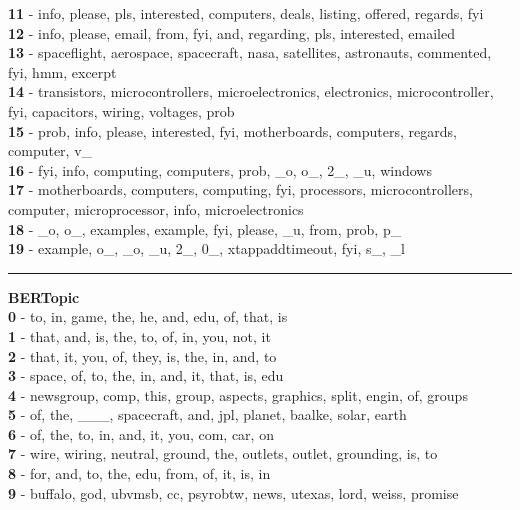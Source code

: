 \textbf{11} - info, please, pls, interested, computers, deals, listing, offered, regards, fyi\\
\textbf{12} - info, please, email, from, fyi, and, regarding, pls, interested, emailed\\
\textbf{13} - spaceflight, aerospace, spacecraft, nasa, satellites, astronauts, commented, fyi, hmm, excerpt\\
\textbf{14} - transistors, microcontrollers, microelectronics, electronics, microcontroller, fyi, capacitors, wiring, voltages, prob\\
\textbf{15} - prob, info, please, interested, fyi, motherboards, computers, regards, computer, v\_\\
\textbf{16} - fyi, info, computing, computers, prob, \_o, o\_, 2\_, \_u, windows\\
\textbf{17} - motherboards, computers, computing, fyi, processors, microcontrollers, computer, microprocessor, info, microelectronics\\
\textbf{18} - \_o, o\_, examples, example, fyi, please, \_u, from, prob, p\_\\
\textbf{19} - example, o\_, \_o, \_u, 2\_, 0\_, xtappaddtimeout, fyi, s\_, \_l\\
\hrule\vspace{2mm}
\noindent
\textbf{BERTopic}\vspace{2mm}\\
\vspace{2mm}
\noindent
\textbf{0} - to, in, game, the, he, and, edu, of, that, is\\
\textbf{1} - that, and, is, the, to, of, in, you, not, it\\
\textbf{2} - that, it, you, of, they, is, the, in, and, to\\
\textbf{3} - space, of, to, the, in, and, it, that, is, edu\\
\textbf{4} - newsgroup, comp, this, group, aspects, graphics, split, engin, of, groups\\
\textbf{5} - of, the, \_\_\_, spacecraft, and, jpl, planet, baalke, solar, earth\\
\textbf{6} - of, the, to, in, and, it, you, com, car, on\\
\textbf{7} - wire, wiring, neutral, ground, the, outlets, outlet, grounding, is, to\\
\textbf{8} - for, and, to, the, edu, from, of, it, is, in\\
\textbf{9} - buffalo, god, ubvmsb, cc, psyrobtw, news, utexas, lord, weiss, promise\\

